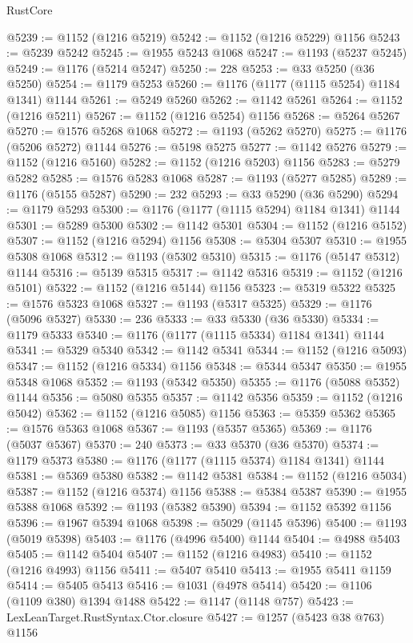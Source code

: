\begin{lexlean}{RustCore}
\begin{coremodule}
@5239 := @1152 (@1216 @5219)
@5242 := @1152 (@1216 @5229) @1156
@5243 := @5239 @5242
@5245 := @1955 @5243 @1068
@5247 := @1193 (@5237 @5245)
@5249 := @1176 (@5214 @5247)
@5250 := 228
@5253 := @33 @5250 (@36 @5250)
@5254 := @1179 @5253
@5260 := @1176 (@1177 (@1115 @5254) @1184 @1341) @1144
@5261 := @5249 @5260
@5262 := @1142 @5261
@5264 := @1152 (@1216 @5211)
@5267 := @1152 (@1216 @5254) @1156
@5268 := @5264 @5267
@5270 := @1576 @5268 @1068
@5272 := @1193 (@5262 @5270)
@5275 := @1176 (@5206 @5272) @1144
@5276 := @5198 @5275
@5277 := @1142 @5276
@5279 := @1152 (@1216 @5160)
@5282 := @1152 (@1216 @5203) @1156
@5283 := @5279 @5282
@5285 := @1576 @5283 @1068
@5287 := @1193 (@5277 @5285)
@5289 := @1176 (@5155 @5287)
@5290 := 232
@5293 := @33 @5290 (@36 @5290)
@5294 := @1179 @5293
@5300 := @1176 (@1177 (@1115 @5294) @1184 @1341) @1144
@5301 := @5289 @5300
@5302 := @1142 @5301
@5304 := @1152 (@1216 @5152)
@5307 := @1152 (@1216 @5294) @1156
@5308 := @5304 @5307
@5310 := @1955 @5308 @1068
@5312 := @1193 (@5302 @5310)
@5315 := @1176 (@5147 @5312) @1144
@5316 := @5139 @5315
@5317 := @1142 @5316
@5319 := @1152 (@1216 @5101)
@5322 := @1152 (@1216 @5144) @1156
@5323 := @5319 @5322
@5325 := @1576 @5323 @1068
@5327 := @1193 (@5317 @5325)
@5329 := @1176 (@5096 @5327)
@5330 := 236
@5333 := @33 @5330 (@36 @5330)
@5334 := @1179 @5333
@5340 := @1176 (@1177 (@1115 @5334) @1184 @1341) @1144
@5341 := @5329 @5340
@5342 := @1142 @5341
@5344 := @1152 (@1216 @5093)
@5347 := @1152 (@1216 @5334) @1156
@5348 := @5344 @5347
@5350 := @1955 @5348 @1068
@5352 := @1193 (@5342 @5350)
@5355 := @1176 (@5088 @5352) @1144
@5356 := @5080 @5355
@5357 := @1142 @5356
@5359 := @1152 (@1216 @5042)
@5362 := @1152 (@1216 @5085) @1156
@5363 := @5359 @5362
@5365 := @1576 @5363 @1068
@5367 := @1193 (@5357 @5365)
@5369 := @1176 (@5037 @5367)
@5370 := 240
@5373 := @33 @5370 (@36 @5370)
@5374 := @1179 @5373
@5380 := @1176 (@1177 (@1115 @5374) @1184 @1341) @1144
@5381 := @5369 @5380
@5382 := @1142 @5381
@5384 := @1152 (@1216 @5034)
@5387 := @1152 (@1216 @5374) @1156
@5388 := @5384 @5387
@5390 := @1955 @5388 @1068
@5392 := @1193 (@5382 @5390)
@5394 := @1152 @5392 @1156
@5396 := @1967 @5394 @1068
@5398 := @5029 (@1145 @5396)
@5400 := @1193 (@5019 @5398)
@5403 := @1176 (@4996 @5400) @1144
@5404 := @4988 @5403
@5405 := @1142 @5404
@5407 := @1152 (@1216 @4983)
@5410 := @1152 (@1216 @4993) @1156
@5411 := @5407 @5410
@5413 := @1955 @5411 @1159
@5414 := @5405 @5413
@5416 := @1031 (@4978 @5414)
@5420 := @1106 (@1109 @380) @1394 @1488
@5422 := @1147 (@1148 @757)
@5423 := LexLeanTarget.RustSyntax.Ctor.closure
@5427 := @1257 (@5423 @38 @763) @1156

\end{coremodule}
\end{lexlean}
